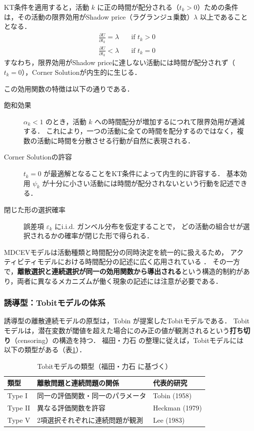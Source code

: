 KT条件を適用すると，活動 $k$ に正の時間が配分される（$t_k > 0$）ための条件は，その活動の限界効用がShadow price（ラグランジュ乗数）$\lambda$ 以上であることとなる．
\begin{align}
  \frac{\partial U}{\partial t_k} = \lambda &\quad \text{if } t_k > 0 \label{eq:mdcev_kt_interior} \\
  \frac{\partial U}{\partial t_k} < \lambda &\quad \text{if } t_k = 0 \label{eq:mdcev_kt_corner}
\end{align}
すなわち，限界効用がShadow priceに達しない活動には時間が配分されず（$t_k = 0$），Corner Solutionが内生的に生じる．

この効用関数の特徴は以下の通りである．
\begin{description}
  \item[飽和効果]
    $\alpha_k < 1$ のとき，活動 $k$ への時間配分が増加するにつれて限界効用が逓減する．
    これにより，一つの活動に全ての時間を配分するのではなく，複数の活動に時間を分散させる行動が自然に表現される．
  \item[Corner Solutionの許容]
    $t_k = 0$ が最適解となることをKT条件によって内生的に許容する．
    基本効用 $\psi_k$ が十分に小さい活動には時間が配分されないという行動を記述できる．
  \item[閉じた形の選択確率]
    誤差項 $\varepsilon_k$ にi.i.d. ガンベル分布を仮定することで，
    どの活動の組合せが選択されるかの確率が閉じた形で得られる．
\end{description}

MDCEVモデルは活動種類と時間配分の同時決定を統一的に扱えるため，
アクティビティモデルにおける時間配分の記述に広く応用されている \cite{BHAT2008274, habib2011random}．
その一方で，\textbf{離散選択と連続選択が同一の効用関数から導出される}という構造的制約があり，両者に異なるメカニズムが働く現象の記述には注意が必要である．

\subsubsection{誘導型：Tobitモデルの体系}\label{sssec:tobit_family}

誘導型の離散連続モデルの原型は，Tobin \cite{Tobin1958} が提案したTobitモデルである．
Tobitモデルは，潜在変数が閾値を超えた場合にのみ正の値が観測されるという\textbf{打ち切り}（censoring）の構造を持つ．
福田・力石 \cite{FukudaChikaraishi2013} の整理に従えば，Tobitモデルには以下の類型がある（表\ref{tab:tobit_types}）．

\begin{table}[htb]
\centering
\caption{Tobitモデルの類型（福田・力石 \cite{FukudaChikaraishi2013} に基づく）}
\label{tab:tobit_types}
\begin{tabular}{l l l}
\hline
類型 & 離散問題と連続問題の関係 & 代表的研究 \\
\hline
Type I  & 同一の評価関数・同一のパラメータ & Tobin (1958) \cite{Tobin1958} \\
Type II & 異なる評価関数を許容 & Heckman (1979) \cite{Heckman1979} \\
Type V  & 2項選択それぞれに連続問題が観測 & Lee (1983) \\
\hline
\end{tabular}
\end{table}

